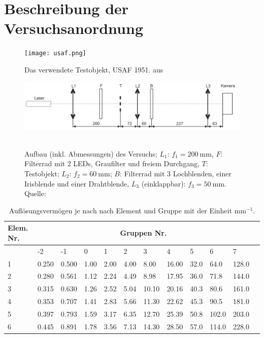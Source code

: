 \documentclass{article}
\begin{document}
\section{Beschreibung der Versuchsanordnung}

\begin{figure}[H]
\caption{Das verwendete Testobjekt, USAF 1951. aus \cite{quelle6}}
\label{fig:usaf}
{\centering
\texttt{[image: usaf.png]}
~
}
\end{figure}


\begin{figure}[H]
\caption{Aufbau (inkl. Abmessungen) des Versuchs; $L_1$: $f_1= 200~$mm, $F$: Filterrad mit 2 LEDs, Graufilter und freiem Durchgang, $T$: Testobjekt; $L_2$: $f_2= 60~$mm; $B$: Filterrad mit 3 Lochblenden, einer Irisblende und einer Drahtblende, $L_3$ (einklappbar): $f_3= 50~$mm. Quelle: \cite{quelle6}}
\label{fig:usaf}
{\centering
\includegraphics[scale=1]{versuch.png}
~
}
\end{figure}



\begin{table}
\caption{Auflösungsvermögen je nach nach Element und Gruppe mit der Einheit mm$^{-1}$.}
\label{tab:aufl}
\begin{tabular}{|l||l|l|l|l|l|l|l|l|l|l|l|}
\hline
\textbf{Elem. Nr.} & \multicolumn{10}{|c|}{\textbf{Gruppen Nr.}}\\
\hline
& -2 & -1 & 0 & 1 & 2 & 3 & 4 & 5 & 6 & 7 \\
\hline
1 & 0.250 & 0.500 & 1.00 & 2.00 & 4.00 & 8.00 & 16.00 & 32.0 & 64.0 & 128.0 \\
\hline
2 & 0.280 & 0.561 & 1.12 & 2.24 & 4.49 & 8.98 & 17.95 & 36.0 & 71.8 & 144.0 \\
\hline
3 & 0.315 & 0.630 & 1.26 & 2.52 & 5.04 & 10.10 & 20.16 & 40.3 & 80.6 &  161.0 \\
\hline
4 & 0.353 & 0.707 & 1.41 & 2.83 & 5.66 & 11.30 & 22.62 & 45.3 & 90.5 & 181.0 \\
\hline
5 & 0.397 & 0.793 & 1.59 & 3.17 & 6.35 & 12.70 & 25.39 & 50.8 & 102.0 & 203.0 \\
\hline
6 & 0.445 & 0.891 & 1.78 & 3.56 & 7.13 & 14.30 & 28.50 & 57.0 & 114.0 & 228.0 \\
\hline
\end{tabular}
\end{table}
\end{document}
